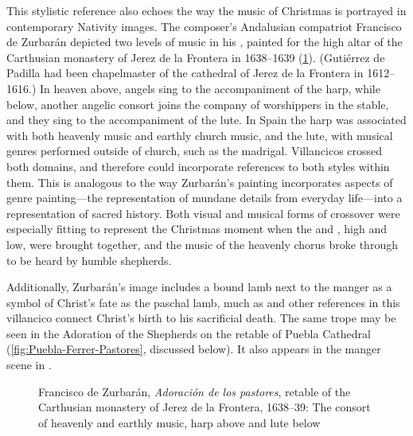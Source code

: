 This stylistic reference also echoes the way the music of Christmas is portrayed
in contemporary Nativity images.
The composer's Andalusian compatriot Francisco de Zurbarán depicted two levels
of music in his , painted for the high altar
of the Carthusian monastery of Jerez de la Frontera in 1638--1639
(\cref{fig:Zurbaran-Jerez-Adoracion}).
(Gutiérrez de Padilla had been chapelmaster of the cathedral of Jerez de la
Frontera in 1612--1616.)%
    \Autocite{Gembero:Padilla}
In heaven above, angels sing to the accompaniment of the harp, while below,
another angelic consort joins the company of worshippers in the stable, and they
sing to the accompaniment of the lute.
In Spain the harp was associated with both heavenly music and earthly church
music, and the lute, with musical genres performed outside of church, such as
the madrigal.
Villancicos crossed both domains, and therefore could incorporate references to
both styles within them.
This is analogous to the way Zurbarán's painting incorporates aspects of genre
painting---the representation of mundane details from everyday life---into a
representation of sacred history.%
    \Autocites[31]{Sanchez:Zurbaran}{Cherry:Bodegon}{Haraszti-Takacs:Genre}
Both visual and musical forms of crossover were especially fitting to represent
the Christmas moment when the  and , high and low,
were brought together, and the music of the heavenly chorus broke through to be
heard by humble shepherds.%
\begin{Footnote}
    Additionally, Zurbarán's image includes a bound lamb next to the manger as a
    symbol of Christ's fate as the paschal lamb, much as  and other references in this villancico connect Christ's birth
    to his sacrificial death.
    The same trope may be seen in the Adoration of the Shepherds on the retable
    of Puebla Cathedral (\cref{fig:Puebla-Ferrer-Pastores}, discussed below).
    It also appears in the manger scene in
    \autocite[168]{Catholic:Breviarium1631}.
\end{Footnote}

\begin{figure}
    \caption{Francisco de Zurbarán, \emph{Adoración de los pastores}, retable of
    the Carthusian monastery of Jerez de la Frontera, 1638--39: The consort of
    heavenly and earthly music, harp above and lute below}

    \label{fig:Zurbaran-Jerez-Adoracion}
\end{figure}

